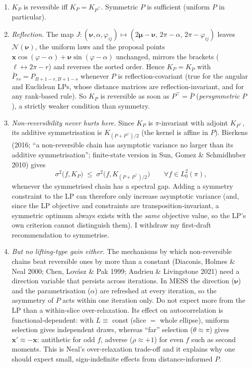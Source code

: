 \documentclass[11pt,a4paper]{article}
\theoremstyle{remark}
\newcommand{\bx}{\bm{x}}
\newcommand{\bnu}{\bm{\nu}}
\begin{document}
\begin{enumerate}[leftmargin=*]
\item $K_P$ is reversible iff $K_P=K_{P^\top}$. Symmetric $P$ is sufficient (uniform $P$ in particular).
\item \emph{Reflection.} The map $J:(\bnu,\alpha,\varphi_{ij})\mapsto(2\bm\mu-\bnu,\,2\pi-\alpha,\,2\pi-\varphi_{ij})$ leaves $\mathcal N(\bnu)$, the uniform laws and the proposal points $\bx\cos(\varphi-\alpha)+\bnu\sin(\varphi-\alpha)$ unchanged, mirrors the brackets ($\ell\leftrightarrow2\pi-r$) and reverses the sorted order. Hence $K_P=K_{\bar P}$ with $\bar P_{rs}=P_{B+1-r,B+1-s}$ whenever $P$ is reflection-covariant (true for the angular and Euclidean LPs, whose distance matrices are reflection-invariant, and for any rank-based rule). So $K_P$ is reversible as soon as $P^\top=\bar P$ (\emph{persymmetric} $P$), a strictly weaker condition than symmetry.
\item \emph{Non-reversibility never hurts here.} Since $K_P$ is $\pi$-invariant with adjoint $K_{P^\top}$, its additive symmetrisation is $K_{(P+P^\top)/2}$ (the kernel is affine in $P$). Bierkens (2016; ``a non-reversible chain has asymptotic variance no larger than its additive symmetrisation''; finite-state version in Sun, Gomez \& Schmidhuber 2010) gives
\[
\sigma^2\big(f,K_P\big)\;\le\;\sigma^2\big(f,K_{(P+P^\top)/2}\big)\qquad\forall f\in L^2_0(\pi),
\]
whenever the symmetrised chain has a spectral gap. Adding a symmetry constraint to the LP can therefore only increase asymptotic variance (and, since the LP objective and constraints are transposition-invariant, a symmetric optimum always exists with the \emph{same} objective value, so the LP's own criterion cannot distinguish them). I withdraw my first-draft recommendation to symmetrise.
\item \emph{But no lifting-type gain either.} The mechanisms by which non-reversible chains beat reversible ones by more than a constant (Diaconis, Holmes \& Neal 2000; Chen, Lov\'asz \& Pak 1999; Andrieu \& Livingstone 2021) need a direction variable that persists across iterations. In MESS the direction ($\bnu$) and the parametrisation ($\alpha$) are refreshed at every iteration, so the asymmetry of $P$ acts within one iteration only. Do not expect more from the LP than a within-slice over-relaxation. Its effect on autocorrelation is functional-dependent: with $L\equiv$ const (slice $=$ whole ellipse), uniform selection gives independent draws, whereas ``far'' selection ($\theta\approx\pi$) gives $\bx'\approx-\bx$: antithetic for odd $f$, adverse ($\rho\approx+1$) for even $f$ such as second moments. This is Neal's over-relaxation trade-off and it explains why one should expect small, sign-indefinite effects from distance-informed $P$.
\end{enumerate}
\end{document}
